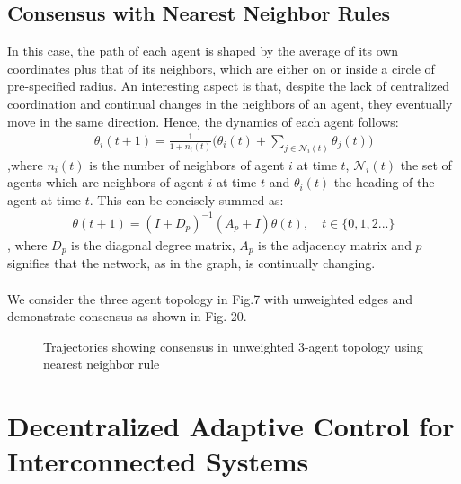 \documentclass[journal]{IEEEtran}
\begin{document}
\subsection{Consensus with Nearest Neighbor Rules}
In this case, the path of each agent is shaped by the average of its own coordinates plus that of its neighbors, which are either on or inside a circle of pre-specified radius. An interesting aspect is that, despite the lack of centralized coordination and continual changes in the neighbors of an agent, they eventually move in the same direction.  Hence, the dynamics of each agent follows: \begin{align} \theta_i(t+1) = \frac{1}{1+n_i(t)}\Big(\theta_i(t) + \sum_{j\in \mathcal{N}_i(t)}\theta_j(t) \Big) \end{align},where $n_i(t)$ is the number of neighbors of agent $i$ at time $t$, $\mathcal{N}_i(t)$ the set of agents which are neighbors of agent $i$ at time $t$ and $\theta_i(t)$ the heading of the agent at time $t$. This can be concisely summed as: \begin{align} \theta(t+1) = (I+D_p)^{-1}(A_p+I)\theta(t),\quad t \in \{0,1,2...\} \end{align}, where $D_p$ is the diagonal degree matrix, $A_p$ is the adjacency matrix and $p$ signifies that the network, as in the graph, is continually changing. \\\\We consider the three agent topology in Fig.7 with unweighted edges and demonstrate consensus as shown in Fig. 20. 
\begin{figure}[h]
\caption{Trajectories showing consensus in unweighted 3-agent topology using nearest neighbor rule}
 \end{figure}

\section{Decentralized Adaptive Control for Interconnected Systems}
\end{document}
